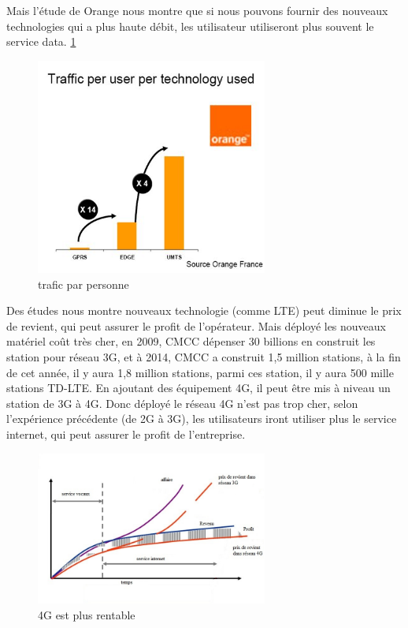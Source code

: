 Mais l'étude de Orange nous montre que si nous pouvons fournir des nouveaux technologies qui a plus haute débit, les utilisateur utiliseront plus souvent le service data.  \ref{traficparpersonne}
  \begin{figure}[H]
   \centering
   \includegraphics[width=3in]{images/orange.JPG}
   \caption{trafic par personne }
   \label{traficparpersonne}
  \end{figure}
 Des études nous montre nouveaux technologie (comme LTE) peut diminue le prix de revient, qui peut assurer le profit de l'opérateur. Mais déployé les nouveaux matériel coût très cher, en 2009, CMCC dépenser 30 billions \textyen en construit les station pour réseau 3G, et à 2014, CMCC a construit 1,5 million stations, à la fin de cet année, il y aura 1,8 million stations, parmi ces station, il y aura 500 mille stations TD-LTE. En ajoutant des équipement 4G, il peut être mis à niveau un station de 3G à 4G. Donc déployé le réseau 4G n'est pas trop cher, selon l'expérience précédente (de 2G à 3G), les utilisateurs iront utiliser plus le service internet, qui peut assurer le profit de l'entreprise.
      \begin{figure}[H]
          \centering
          \includegraphics[width=3in]{images/why4G.jpg}
          \caption{4G est plus rentable}
          \label{why4G}
      \end{figure}
